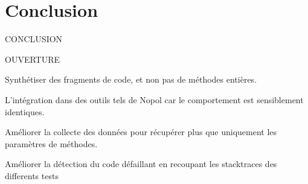 \chapter*{Conclusion}
	\thispagestyle{conclusion}
	
	
\par CONCLUSION
	
	
\par OUVERTURE	
\par Synthétiser des fragments de code, et non pas de méthodes entières.
\par L'intégration dans des outils tels de Nopol car le comportement est sensiblement identiques.
\par Améliorer la collecte des données pour récupérer plus que uniquement les paramètres de méthodes. 
\par Améliorer la détection du code défaillant en recoupant les stacktraces des differents tests
	
	

